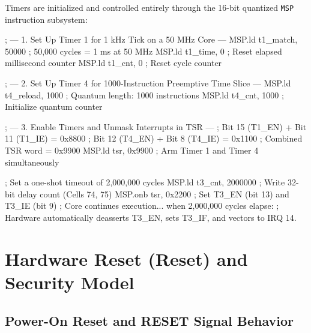 \documentclass[11pt,a4paper]{article}
\begin{document}
Timers are initialized and controlled entirely through the 16-bit quantized \texttt{MSP} instruction subsystem:

\begin{examplebox}[title={Initializing Timer 1 (1 kHz Real-Time Clock) and Timer 4 (OS Quantum Preemption)}]
\begin{limasm}
; --- 1. Set Up Timer 1 for 1 kHz Tick on a 50 MHz Core ---
MSP.ld  t1_match, 50000        ; 50,000 cycles = 1 ms at 50 MHz
MSP.ld  t1_time, 0             ; Reset elapsed millisecond counter
MSP.ld  t1_cnt, 0              ; Reset cycle counter

; --- 2. Set Up Timer 4 for 1000-Instruction Preemptive Time Slice ---
MSP.ld  t4_reload, 1000        ; Quantum length: 1000 instructions
MSP.ld  t4_cnt, 1000           ; Initialize quantum counter

; --- 3. Enable Timers and Unmask Interrupts in TSR ---
; Bit 15 (T1_EN) + Bit 11 (T1_IE) = 0x8800
; Bit 12 (T4_EN) + Bit 8  (T4_IE) = 0x1100
; Combined TSR word = 0x9900
MSP.ld  tsr, 0x9900            ; Arm Timer 1 and Timer 4 simultaneously
\end{limasm}
\end{examplebox}

\begin{examplebox}[title={One-Shot Countdown with Timer 3}]
\begin{limasm}
; Set a one-shot timeout of 2,000,000 cycles
MSP.ld   t3_cnt, 2000000       ; Write 32-bit delay count (Cells 74, 75)
MSP.onb  tsr, 0x2200           ; Set T3_EN (bit 13) and T3_IE (bit 9)
; Core continues execution... when 2,000,000 cycles elapse:
; Hardware automatically deasserts T3_EN, sets T3_IF, and vectors to IRQ 14.
\end{limasm}
\end{examplebox}

\section{Hardware Reset (Reset) and Security Model}

\subsection{Power-On Reset and RESET Signal Behavior}
\end{document}
